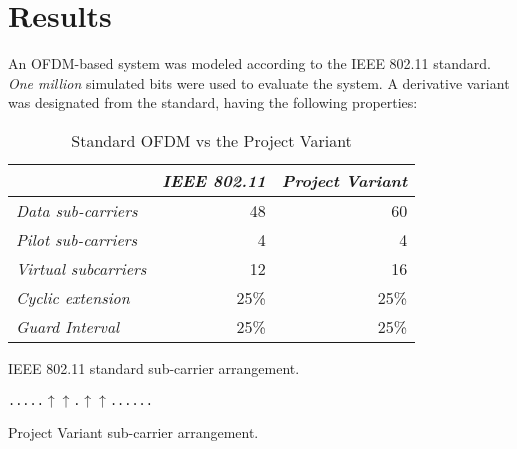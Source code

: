 \chapter{Results}

An OFDM-based system was modeled according to the IEEE 802.11 standard. \emph{One million} simulated bits were used to evaluate the system. A derivative variant was designated from the standard, having the following properties:
\begin{table}[!h]
	\centering
	\begin{tabular}{l r r}
		& \emph{IEEE 802.11} & \emph{Project Variant} \\
		\hline
		\textsl{Data sub-carriers} & 48 & 60 \\
		\textsl{Pilot sub-carriers} & 4 & 4 \\
		\textsl{Virtual subcarriers} & 12 & 16 \\
		\textsl{Cyclic extension} & 25\% & 25\% \\
		\textsl{Guard Interval} & 25\% & 25\% \\
	\end{tabular}
	\caption{Standard OFDM vs the Project Variant}
\end{table}

IEEE 802.11 standard sub-carrier arrangement.
    \begin{center}
      \texttt{.....\textbar \textbar \textbar \textbar \textbar$\uparrow$\textbar \textbar \textbar \textbar \textbar \textbar \textbar \textbar \textbar \textbar \textbar \textbar \textbar \textbar$\uparrow$\textbar \textbar \textbar \textbar \textbar \textbar.\textbar \textbar \textbar \textbar \textbar \textbar$\uparrow$\textbar \textbar \textbar \textbar \textbar \textbar \textbar \textbar \textbar \textbar \textbar \textbar \textbar$\uparrow$\textbar \textbar \textbar \textbar \textbar...... }

    \end{center}
  
Project Variant sub-carrier arrangement.
      \begin{center}
    \end{center}


